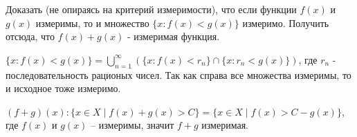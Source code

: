 \begin{task}{1}
Доказать (не опираясь на критерий измеримости), что если функции $f(x)$ и $g(x)$ измеримы, то и множество $\lbrace x : f(x) < g(x) \rbrace$ измеримо. Получить отсюда, что $f(x) + g(x)$ - измеримая функция.
\end{task}
\begin{solution}
$\lbrace x : f(x) < g(x) \rbrace = \bigcup_{n=1}^\infty(\lbrace x : f(x) < r_n \rbrace \cap \lbrace x: r_n < g(x)\rbrace)$, где $r_n$ - последовательность рационых чисел. Так как справа все множества измеримы, то и исходное тоже измеримо.

$(f + g)(x) : \{x \in X \mid f(x) + g(x) > C\} = \{x \in X \mid f(x) > C - g(x)\}$, где $f(x)$ и $g(x)$ -- измеримы, значит $f + g$ измеримая.
\end{solution}